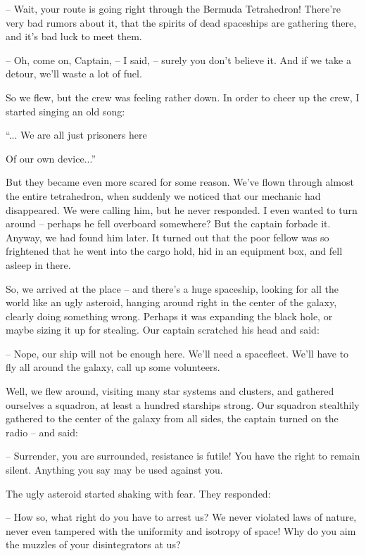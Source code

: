 \documentclass[ebook,oneside,final,openright]{memoir}
\begin{document}
– Wait, your route is going right through the Bermuda Tetrahedron! There’re very bad rumors about it, that the spirits of dead spaceships are gathering there, and it’s bad luck to meet them.\par
– Oh, come on, Captain, – I said, – surely you don’t believe it. And if we take a detour, we’ll waste a lot of fuel.\par
\par
So we flew, but the crew was feeling rather down. In order to cheer up the crew, I started singing an old song: \par
 “... We are all just prisoners here \par
 Of our own device...” \par
 But they became even more scared for some reason. We’ve flown through almost the entire tetrahedron, when suddenly we noticed that our mechanic had disappeared. We were calling him, but he never responded. I even wanted to turn around – perhaps he fell overboard somewhere? But the captain forbade it. Anyway, we had found him later. It turned out that the poor fellow was so frightened that he went into the cargo hold, hid in an equipment box, and fell asleep in there.\par
\par
So, we arrived at the place – and there’s a huge spaceship, looking for all the world like an ugly asteroid, hanging around right in the center of the galaxy, clearly doing something wrong. Perhaps it was expanding the black hole, or maybe sizing it up for stealing. Our captain scratched his head and said:\par
– Nope, our ship will not be enough here. We’ll need a spacefleet. We’ll have to fly all around the galaxy, call up some volunteers.\par
Well, we flew around, visiting many star systems and clusters, and gathered ourselves a squadron, at least a hundred starships strong. Our squadron stealthily gathered to the center of the galaxy from all sides, the captain turned on the radio – and said:\par
– Surrender, you are surrounded, resistance is futile! You have the right to remain silent. Anything you say may be used against you.\par
The ugly asteroid started shaking with fear. They responded:\par
– How so, what right do you have to arrest us? We never violated laws of nature, never even tampered with the uniformity and isotropy of space! Why do you aim the muzzles of your disintegrators at us?\par
\end{document}
